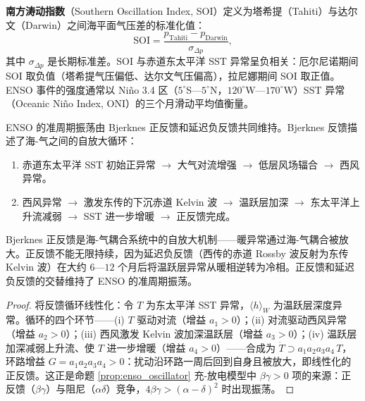 \begin{definition}\label{def:soi}
\textbf{南方涛动指数}（Southern Oscillation Index, SOI）定义为塔希提（Tahiti）与达尔文（Darwin）之间海平面气压差的标准化值：
\[
\text{SOI} = \frac{p_{\text{Tahiti}} - p_{\text{Darwin}}}{\sigma_{\Delta p}},
\]
其中 $\sigma_{\Delta p}$ 是长期标准差。SOI 与赤道东太平洋 SST 异常呈负相关：厄尔尼诺期间 SOI 取负值（塔希提气压偏低、达尔文气压偏高），拉尼娜期间 SOI 取正值。ENSO 事件的强度通常以 Niño 3.4 区（$5^\circ$S—$5^\circ$N，$120^\circ$W—$170^\circ$W）SST 异常（Oceanic Niño Index, ONI）的三个月滑动平均值衡量。
\end{definition}

\begin{proposition}\label{prop:bjerknes_feedback}
ENSO 的准周期振荡由 Bjerknes 正反馈和延迟负反馈共同维持。Bjerknes 反馈描述了海-气之间的自放大循环：
\begin{enumerate}[label=(\roman*)]
    \item 赤道东太平洋 SST 初始正异常 $\to$ 大气对流增强 $\to$ 低层风场辐合 $\to$ 西风异常。
    \item 西风异常 $\to$ 激发东传的下沉赤道 Kelvin 波 $\to$ 温跃层加深 $\to$ 东太平洋上升流减弱 $\to$ SST 进一步增暖 $\to$ 正反馈完成。
\end{enumerate}
Bjerknes 正反馈是海-气耦合系统中的自放大机制——暖异常通过海-气耦合被放大。正反馈不能无限持续，因为延迟负反馈（西传的赤道 Rossby 波反射为东传 Kelvin 波）在大约 $6$—$12$ 个月后将温跃层异常从暖相逆转为冷相。正反馈和延迟负反馈的交替维持了 ENSO 的准周期振荡。
\end{proposition}

\begin{proof}
将反馈循环线性化：令 $T$ 为东太平洋 SST 异常，$\langle h\rangle_W$ 为温跃层深度异常。循环的四个环节——(i) $T$ 驱动对流（增益 $a_1>0$）；(ii) 对流驱动西风异常（增益 $a_2>0$）；(iii) 西风激发 Kelvin 波加深温跃层（增益 $a_3>0$）；(iv) 温跃层加深减弱上升流、使 $T$ 进一步增暖（增益 $a_4>0$）——合成为 $\dot T \supset a_1 a_2 a_3 a_4 \, T$，环路增益 $G = a_1a_2a_3a_4 > 0$：扰动沿环路一周后回到自身且被放大，即线性化的正反馈。这正是命题 \ref{prop:enso_oscillator} 充-放电模型中 $\beta\gamma > 0$ 项的来源：正反馈（$\beta\gamma$）与阻尼（$\alpha\delta$）竞争，$4\beta\gamma > (\alpha-\delta)^2$ 时出现振荡。
\end{proof}

